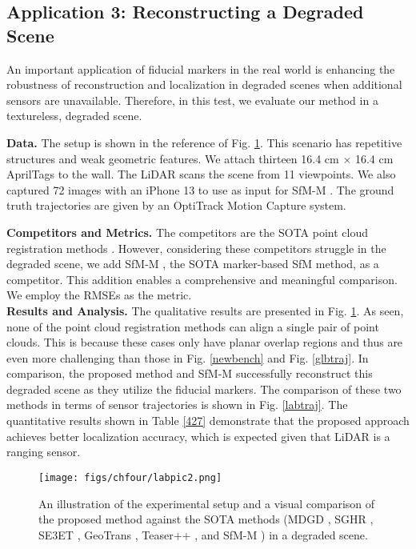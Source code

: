 \subsection{Application 3: Reconstructing a Degraded Scene} \label{test3}
An important application of fiducial markers in the real world is enhancing the robustness of reconstruction and localization in degraded scenes when additional sensors are unavailable. Therefore, in this test, we evaluate our method in a textureless, degraded scene.  \par
\noindent\textbf{Data.}
The setup is shown in the reference of Fig. \ref{labpic}. This scenario has repetitive structures and weak geometric features. We attach thirteen 16.4 cm $\times$ 16.4 cm AprilTags to the wall. The LiDAR scans the scene from 11 viewpoints. We also captured 72 images with an iPhone 13 to use as input for SfM-M \cite{qingdao}. The ground truth trajectories are given by an OptiTrack Motion Capture system. 
\par
\noindent\textbf{Competitors and Metrics.}
The competitors are the SOTA point cloud registration methods \cite{mdgd,sghr,se3et,geotransformer,teaser}. However, considering these competitors struggle in the degraded scene, we add SfM-M \cite{qingdao}, the SOTA marker-based SfM method, as a competitor. This addition enables a comprehensive and meaningful comparison. We employ the RMSEs as the metric.\\
%
\noindent\textbf{Results and Analysis.}
The qualitative results are presented in Fig. \ref{labpic}. As seen, none of the point cloud registration methods \cite{mdgd,sghr,se3et,geotransformer,teaser} can align a single pair of point clouds. 
%
This is because these cases only have planar overlap regions and thus are even more challenging than those in Fig. \ref{newbench} and Fig. \ref{glbtraj}. 
%
In comparison, the proposed method and SfM-M \cite{qingdao} successfully reconstruct this degraded scene as they utilize the fiducial markers. The comparison of these two methods in terms of sensor trajectories is shown in Fig. \ref{labtraj}. The quantitative results shown in Table \ref{427} demonstrate that the proposed approach achieves better localization accuracy, which is expected given that LiDAR is a ranging sensor. 
\par
\begin{figure}[H] 
	\centering
\texttt{[image: figs/chfour/labpic2.png]}
	\caption{An illustration of the experimental setup and a visual comparison of the proposed method against the SOTA methods (MDGD \cite{mdgd}, SGHR \cite{sghr}, SE3ET \cite{se3et}, GeoTrans \cite{geotransformer}, Teaser++ \cite{teaser}, and SfM-M \cite{qingdao}) in a degraded scene.}
	\label{labpic}
\end{figure}

